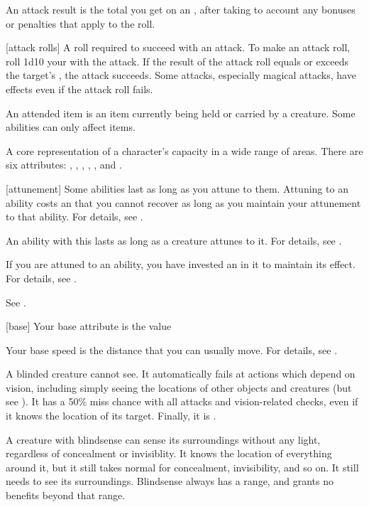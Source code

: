  An attack result is the total you get on an , after taking to account any bonuses or penalties that apply to the roll.

[attack rolls] A roll required to succeed with an attack.
To make an attack roll, roll 1d10 \add your  with the attack.
If the result of the attack roll equals or exceeds the target's , the attack succeeds.
Some attacks, especially magical attacks, have effects even if the attack roll fails.

 An attended item is an item currently being held or carried by a creature.
Some abilities can only affect  items.

 A core representation of a character's capacity in a wide range of areas. There are six attributes: , , , , , and .

[attunement] Some abilities last as long as you attune to them.
Attuning to an ability costs an  that you cannot recover as long as you maintain your attunement to that ability.
For details, see .

 An ability with this  lasts as long as a creature attunes to it.
For details, see .

 If you are attuned to an ability, you have invested an  in it to maintain its effect.
For details, see .

 See .

[base] Your base attribute is the value 

 Your base speed is the distance that you can usually move.
For details, see .

 A blinded creature cannot see. It automatically fails at actions which depend on vision, including simply seeing the locations of other objects and creatures (but see ). It has a 50\% miss chance with all attacks and vision-related checks, even if it knows the location of its target. Finally, it is .

 A creature with blindsense can sense its surroundings without any light, regardless of concealment or invisiblity.
It knows the location of everything around it, but it still takes normal  for concealment, invisibility, and so on.
It still needs  to see its surroundings.
Blindsense always has a range, and grants no benefits beyond that range.

